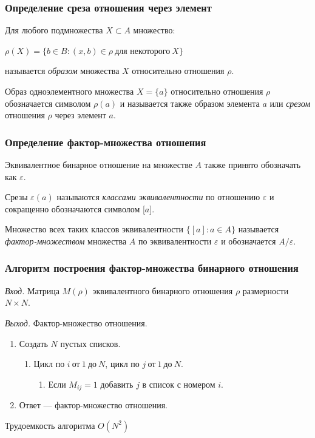 \documentclass[bachelor, och, labwork]{shiza}
\begin{document}
\subsubsection{Определение среза отношения через элемент}
Для любого подмножества $X \subset A$ множество:
\begin{center} $\rho(X)=\{b \in B:(x,b)\in \rho ~\text{для некоторого}~ X\}$ \end{center}
называется \textit{образом} множества $X$ относительно отношения $\rho$.

Образ одноэлементного множества $X=\{a\}$ относительно отношения $\rho$
обозначается символом $\rho(a)$ и называется также образом элемента $a$ или
\textit{срезом} отношения $\rho$ через элемент $a$.

\subsubsection{Определение фактор-множества отношения}

Эквивалентное бинарное отношение на множестве $A$ также принято обозначать как
$\varepsilon$.

Срезы $\varepsilon(a)$ называются \textit{классами эквивалентности} по отношению
$\varepsilon$ и сокращенно обозначаются символом [$a$].

Множество всех таких классов эквивалентности $\{[a]:a\in A\}$ называется 
\textit{фактор-множеством} множества $A$ по эквивалентности $\varepsilon$ и 
обозначается $A/\varepsilon$.

\subsubsection{Алгоритм построения фактор-множества бинарного отношения}

\textit{Вход.} Матрица $M(\rho)$ эквивалентного бинарного отношения $\rho$ размерности
$N \times N$.

\textit{Выход.} Фактор-множество отношения.

\begin{enumerate}
    \item Создать $N$ пустых списков.
    \begin{enumerate}[label=a)]
        \item Цикл по $i ~\text{от}~ 1 ~\text{до}~ N$, цикл по $j ~\text{от}~ 1 ~\text{до}~ N$.
        \begin{enumerate}[label=1.]\item Если $M_{ij} = 1$ добавить $j$ в список
        с номером $i$.\end{enumerate}        
    \end{enumerate}
    \item Ответ --- фактор-множество отношения.
\end{enumerate}
Трудоемкость алгоритма $O(N^2)$
\end{document}
